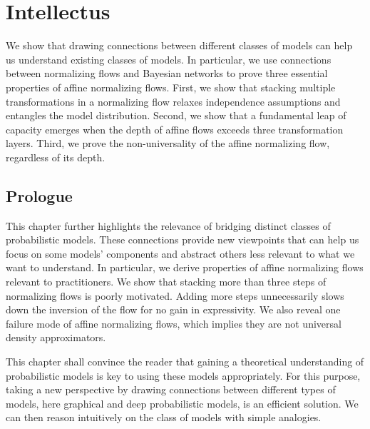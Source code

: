 \chapter{Intellectus}\label{ch:04}

\begin{chapter_outline}

  We show that drawing connections between different classes of models can help us understand existing classes of models.
  In particular, we use connections between normalizing flows and Bayesian networks to prove three essential properties of affine normalizing flows.
  First, we show that stacking multiple transformations in a normalizing flow relaxes independence assumptions and entangles the model distribution.
  Second, we show that a fundamental leap of capacity emerges when the depth of affine flows exceeds three transformation layers.
  Third, we prove the non-universality of the affine normalizing flow, regardless of its depth.
\end{chapter_outline}

\section{Prologue}
This chapter further highlights the relevance of bridging distinct classes of probabilistic models. These connections provide new viewpoints that can help us focus on some models' components and abstract others less relevant to what we want to understand. In particular, we derive properties of affine normalizing flows relevant to practitioners. We show that stacking more than three steps of normalizing flows is poorly motivated. Adding more steps unnecessarily slows down the inversion of the flow for no gain in expressivity. We also reveal one failure mode of affine normalizing flows, which implies they are not universal density approximators.

This chapter shall convince the reader that gaining a theoretical understanding of probabilistic models is key to using these models appropriately. For this purpose, taking a new perspective by drawing connections between different types of models, here graphical and deep probabilistic models, is an efficient solution. We can then reason intuitively on the class of models with simple analogies.

